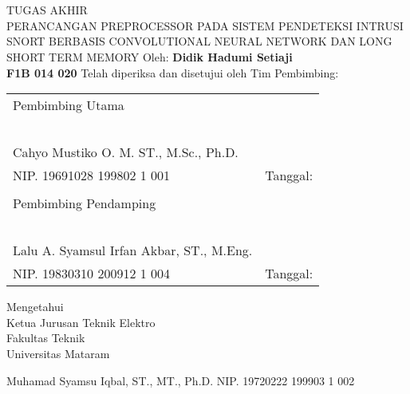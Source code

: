 \documentclass[./skripsi.tex]{subfiles}
\begin{document}
\section*{}
\begin{center}
    TUGAS AKHIR \\
PERANCANGAN PREPROCESSOR PADA SISTEM PENDETEKSI INTRUSI SNORT BERBASIS CONVOLUTIONAL NEURAL NETWORK DAN LONG SHORT TERM MEMORY \linebreak \linebreak
Oleh: \linebreak
\textbf{Didik Hadumi Setiaji}\\
\textbf{F1B 014 020} \linebreak \linebreak
Telah diperiksa dan disetujui oleh Tim Pembimbing:

\end{center}

\begin{tabular}{lr}
Pembimbing Utama \\ \\ \\ \\ \\ \\
Cahyo Mustiko O. M. ST., M.Sc., Ph.D. \\
NIP. 19691028 199802 1 001
& Tanggal:  \\
& \\
Pembimbing Pendamping \\ \\ \\ \\ \\ \\
Lalu A. Syamsul Irfan Akbar, ST., M.Eng. \\

NIP. 19830310 200912 1 004
& Tanggal: \\
\end{tabular}
\vfill
\begin{center}
    Mengetahui \\
    Ketua Jurusan Teknik Elektro \\
    Fakultas Teknik \\
    Universitas Mataram \linebreak \linebreak \linebreak \linebreak \linebreak
    
    Muhamad Syamsu Iqbal, ST., MT., Ph.D. \linebreak
    NIP. 19720222 199903 1 002
\end{center}
\clearpage
\end{document}
